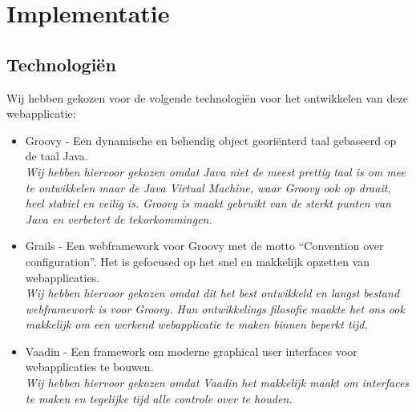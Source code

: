 \chapter{Implementatie}

\section{Technologi\"en}

Wij hebben gekozen voor de volgende technologi\"en voor het ontwikkelen van deze webapplicatie:
\begin{itemize}
	\item Groovy - Een dynamische en behendig object geori\"enterd taal gebaseerd op de taal Java.
	\vspace{2mm} \\
	\textit{Wij hebben hiervoor gekozen omdat Java niet de meest prettig taal is om mee te ontwikkelen maar de Java Virtual Machine, waar Groovy ook op draait, heel stabiel en veilig is. Groovy is maakt gebruikt van de sterkt punten van Java en verbetert de tekorkommingen.}

	\item Grails - Een webframework voor Groovy met de motto ``Convention over configuration''. Het is gefocused op het snel en makkelijk opzetten van webapplicaties.
	\vspace{2mm} \\
	\textit{Wij hebben hiervoor gekozen omdat dit het best ontwikkeld en langst bestand webframework is voor Groovy. Hun ontwikkelings filosofie maakte het ons ook makkelijk om een werkend webapplicatie te maken binnen beperkt tijd.}

	\item Vaadin - Een framework om moderne graphical user interfaces voor webapplicaties te bouwen.
	\vspace{2mm} \\
	\textit{Wij hebben hiervoor gekozen omdat Vaadin het makkelijk maakt om interfaces te maken en tegelijke tijd alle controle over te houden.}
\end{itemize}